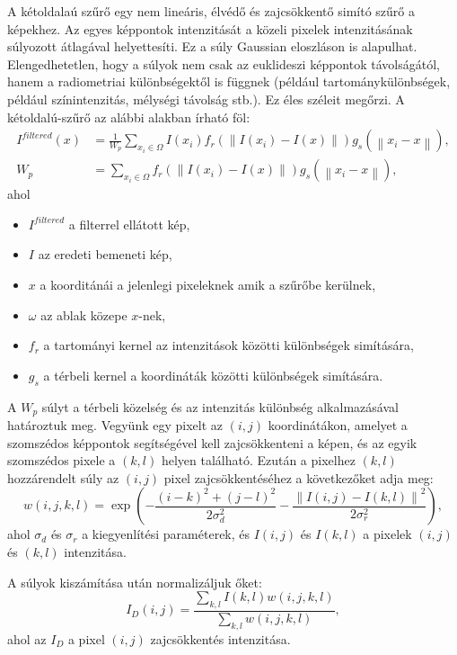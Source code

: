 
A kétoldalaú szűrő egy nem lineáris, élvédő és zajcsökkentő simító szűrő a képekhez. Az egyes képpontok intenzitását a közeli pixelek intenzitásának súlyozott átlagával helyettesíti. Ez a súly Gaussian eloszláson is  alapulhat. Elengedhetetlen, hogy a súlyok nem csak az euklideszi képpontok távolságától, hanem a radiometriai különbségektől is függnek (például tartománykülönbségek, például színintenzitás, mélységi távolság stb.). Ez éles széleit megőrzi. A kétoldalú-szűrő az alábbi alakban írható föl:
\begin{align*}
I^{filtered}(x) &=
\frac{1}{W_p}\sum_{x_i\in\Omega}{I(x_i)f_r(\left \| I(x_i)-I(x) \right \|)g_s(\left \| x_i-x \right \|)}, \\
W_p &=
\sum_{x_i \in \Omega} f_r(\left \| I(x_i)-I(x) \right \|)g_s(\left \| x_i-x \right \|),
\end{align*}
ahol
\begin{itemize}
\item $I^{filtered}$ a filterrel ellátott kép,
\item $I$ az eredeti bemeneti kép,
\item $x$ a koorditánái a jelenlegi pixeleknek amik a szűrőbe kerülnek,
\item $\omega$ az ablak közepe $x$-nek,
\item $f_r$ a tartományi kernel az intenzitások közötti különbségek simítására,
\item $g_s$ a térbeli kernel a koordináták közötti különbségek simítására.
\end{itemize}
A $W_p$ súlyt a térbeli közelség és az intenzitás különbség alkalmazásával határoztuk meg. Vegyünk egy pixelt az $(i, j)$ koordinátákon, amelyet a szomszédos képpontok segítségével kell zajcsökkenteni a képen, és az egyik szomszédos pixele a $(k, l)$ helyen található. Ezután a pixelhez $(k, l)$ hozzárendelt súly az $(i, j)$ pixel zajcsökkentéséhez a következőket adja meg:
$$
w(i, j, k, l) =
\exp \left(
-\frac{(i-k)^{2}+(j-l)^{2}}{2\sigma_{d}^{2}}
-\frac{\left \| I(i,j)-I(k,l) \right \|^{2}}{2\sigma_{r}^{2}}
\right),
$$
ahol $\sigma_d$ és $\sigma_r$ a kiegyenlítési paraméterek, és $I(i, j)$ és $I(k, l)$ a pixelek $(i, j)$ és $(k, l)$ intenzitása.

A súlyok kiszámítása után normalizáljuk őket:
$$
I_{D}(i,j) =
\frac{\sum_{k,l}I(k,l)w(i, j, k, l)}{\sum_{k, l}w(i, j, k, l)},
$$
ahol az $I_D$ a pixel $(i, j)$ zajcsökkentés intenzitása.

